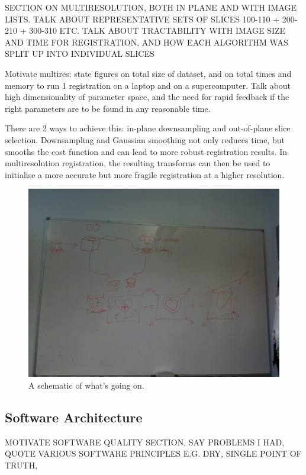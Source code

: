       SECTION ON MULTIRESOLUTION, BOTH IN PLANE AND WITH IMAGE LISTS. TALK ABOUT REPRESENTATIVE SETS OF SLICES 100-110 + 200-210 + 300-310 ETC. TALK ABOUT TRACTABILITY WITH IMAGE SIZE AND TIME FOR REGISTRATION, AND HOW EACH ALGORITHM WAS SPLIT UP INTO INDIVIDUAL SLICES
  
      Motivate multires: state figures on total size of dataset, and on total times and memory to run 1 registration on a laptop and on a supercomputer. Talk about high dimensionality of parameter space, and the need for rapid feedback if the right parameters are to be found in any reasonable time.
    
      There are 2 ways to achieve this: in-plane downsampling and out-of-plane slice selection. Downsampling and Gaussian smoothing not only reduces time, but smooths the cost function and can lead to more robust registration results. In multiresolution registration, the resulting transforms can then be used to initialise a more accurate but more fragile registration at a higher resolution.
  
  
  
  \begin{figure}[htbp]
    \centering
    \includegraphics[height=0.7\textwidth]{Ch6/Figs/process_diagram}
    \caption{A schematic of what's going on.}
  \end{figure}
  
  \subsection{Software Architecture} %
  \label{sub:software_architecture}
    MOTIVATE SOFTWARE QUALITY SECTION, SAY PROBLEMS I HAD, QUOTE VARIOUS SOFTWARE PRINCIPLES E.G. DRY, SINGLE POINT OF TRUTH,

